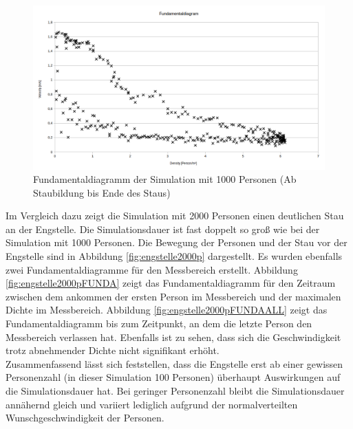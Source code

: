\begin{figure}[ht]
	\centering
  \includegraphics[width=\textwidth]{abbildungen/engstelle/1000P/fundamentalDiagram1000personsALLDATA.png}
	\caption{Fundamentaldiagramm der Simulation mit 1000 Personen (Ab Staubildung bis Ende des Staus)}
	\label{fig:engstelle1000pFUNDAALL}
\end{figure}

Im Vergleich dazu zeigt die Simulation mit 2000 Personen einen deutlichen Stau an der Engstelle. Die Simulationsdauer ist fast doppelt so groß wie bei der Simulation mit 1000 Personen. Die Bewegung der Personen und der Stau vor der Engstelle sind in Abbildung \ref{fig:engstelle2000p} dargestellt. Es wurden ebenfalls zwei Fundamentaldiagramme für den Messbereich erstellt. Abbildung \ref{fig:engstelle2000pFUNDA} zeigt das Fundamentaldiagramm für den Zeitraum zwischen dem ankommen der ersten Person im Messbereich und der maximalen Dichte im Messbereich. Abbildung \ref{fig:engstelle2000pFUNDAALL} zeigt das Fundamentaldiagramm bis zum Zeitpunkt, an dem die letzte Person den Messbereich verlassen hat. Ebenfalls ist zu sehen, dass sich die Geschwindigkeit trotz abnehmender Dichte nicht signifikant erhöht.\\

Zusammenfassend lässt sich feststellen, dass die Engstelle erst ab einer gewissen Personenzahl (in dieser Simulation 100 Personen) überhaupt Auswirkungen auf die Simulationsdauer hat. Bei geringer Personenzahl bleibt die Simulationsdauer annähernd gleich und variiert lediglich aufgrund der normalverteilten Wunschgeschwindigkeit der Personen. 

